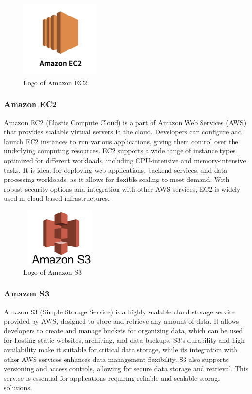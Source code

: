 \documentclass[conference]{IEEEtran}
\begin{document}
        \begin{figure}[htbp]
            \centerline{\includegraphics[width=4cm, height=4cm]{Images/logo/aws.png}}
            \caption{Logo of Amazon EC2}
            \label{fig}
        \end{figure}
        \subsubsection{Amazon EC2}
            Amazon EC2 (Elastic Compute Cloud) is a part of Amazon Web Services (AWS) that provides scalable virtual servers in the cloud. Developers can configure and launch EC2 instances to run various applications, giving them control over the underlying computing resources. EC2 supports a wide range of instance types optimized for different workloads, including CPU-intensive and memory-intensive tasks. It is ideal for deploying web applications, backend services, and data processing workloads, as it allows for flexible scaling to meet demand. With robust security options and integration with other AWS services, EC2 is widely used in cloud-based infrastructures.

        \begin{figure}[htbp]
            \centerline{\includegraphics[width=4cm, height=3cm]{Images/logo/awss3.png}}
            \caption{Logo of Amazon S3}
            \label{fig}
        \end{figure}
        \subsubsection{Amazon S3}
            Amazon S3 (Simple Storage Service) is a highly scalable cloud storage service provided by AWS, designed to store and retrieve any amount of data. It allows developers to create and manage buckets for organizing data, which can be used for hosting static websites, archiving, and data backups. S3's durability and high availability make it suitable for critical data storage, while its integration with other AWS services enhances data management flexibility. S3 also supports versioning and access controls, allowing for secure data storage and retrieval. This service is essential for applications requiring reliable and scalable storage solutions.
\end{document}
